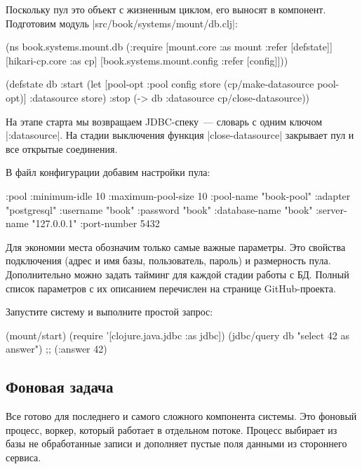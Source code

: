 Поскольку пул это объект с жизненным циклом, его выносят в компонент. Подготовим
модуль \spverb|src/book/systems/mount/db.clj|:

\begin{code}
(ns book.systems.mount.db
  (:require
   [mount.core :as mount :refer [defstate]]
   [hikari-cp.core :as cp]
   [book.systems.mount.config :refer [config]]))

(defstate db
  :start
  (let [{pool-opt :pool} config
        store (cp/make-datasource pool-opt)]
    {:datasource store})
  :stop
  (-> db :datasource cp/close-datasource))
\end{code}

На этапе старта мы возвращаем JDBC-спеку~--- словарь с одним ключом
\spverb|:datasource|. На стадии выключения функция \spverb|close-datasource| закрывает пул и
все открытые соединения.

В файл конфигурации добавим настройки пула:

\begin{code}
{:pool {:minimum-idle       10
        :maximum-pool-size  10
        :pool-name          "book-pool"
        :adapter            "postgresql"
        :username           "book"
        :password           "book"
        :database-name      "book"
        :server-name        "127.0.0.1"
        :port-number        5432}}
\end{code}

Для экономии места обозначим только самые важные параметры. Это свойства
подключения (адрес и имя базы, пользователь, пароль) и размерность
пула. Дополнительно можно задать тайминг для каждой стадии работы с БД. Полный
список параметров с их описанием перечислен на странице GitHub-проекта.

Запустите систему и выполните простой запрос:

\begin{code}
(mount/start)
(require '[clojure.java.jdbc :as jdbc])
(jdbc/query db "select 42 as answer")
;; ({:answer 42})
\end{code}

\subsection{Фоновая задача}

Все готово для последнего и самого сложного компонента системы. Это фоновый
процесс, воркер, который работает в отдельном потоке. Процесс выбирает из базы
не обработанные записи и дополняет пустые поля данными из стороннего сервиса.

